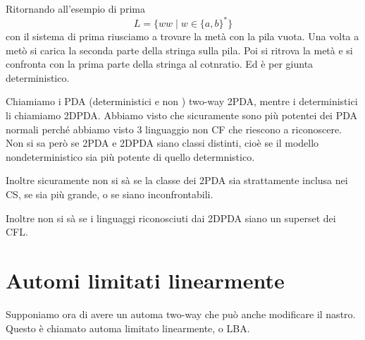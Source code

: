 \documentclass[12pt]{report}
\theoremstyle{definition}
\begin{document}
Ritornando all'esempio di prima
$$ L = \{ w w \mid w \in \{a, b\}^* \} $$
con il sistema di prima riusciamo a trovare la metà con la pila vuota.
Una volta a metò si carica la seconda parte della stringa sulla pila.
Poi si ritrova la metà e si confronta con la prima parte della stringa al cotnratio.
Ed è per giunta deterministico.

Chiamiamo i PDA (deterministici e non ) two-way 2PDA, mentre i deterministici li chiamiamo 2DPDA.
Abbiamo visto che sicuramente sono più potentei dei PDA normali perché abbiamo visto 3 linguaggio non CF che riescono a riconoscere.
Non si sa però se 2PDA e 2DPDA siano classi distinti, cioè se il modello nondeterministico sia più potente di quello determnistico.

Inoltre sicuramente non si sà se la classe dei 2PDA sia strattamente inclusa nei CS, se sia più grande, o se siano inconfrontabili.

Inoltre non si sà se i linguaggi riconosciuti dai 2DPDA siano un superset dei CFL.

\section{Automi limitati linearmente}\label{sec:automi limitati linearmente}
Supponiamo ora di avere un automa two-way che può anche modificare il nastro.
Questo è chiamato automa limitato linearmente, o LBA.
\end{document}
